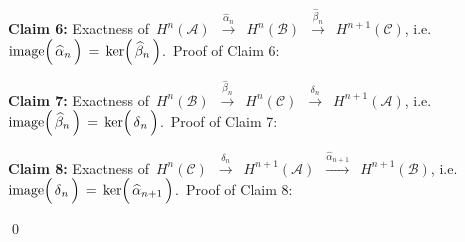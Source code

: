 \vskip 0.5cm
\noindent
\textbf{Claim 6:}\;\;
Exactness of
\,$H^{n}(\mathcal{A})$
\,$\overset{\widehat{\alpha}_{n}}{\longrightarrow}$\,
$H^{n}(\mathcal{B})$
\,$\overset{\widehat{\beta}_{n}}{\longrightarrow}$\,
$H^{n+1}(\mathcal{C})$,\;
i.e.
\,$\image\!\left(\,\overset{{\color{white}.}}{\widehat{\alpha}_{n}}\,\right) \,=\, \ker\!\left(\,\widehat{\beta}_{n}\,\right)$.\,
\vskip 0.2cm
\noindent
Proof of Claim 6:\,


\vskip 0.5cm
\noindent
\textbf{Claim 7:}\;\;
Exactness of
\,$H^{n}(\mathcal{B})$
\,$\overset{\widehat{\beta}_{n}}{\longrightarrow}$\,
$H^{n}(\mathcal{C})$
\,$\overset{\delta_{n}}{\longrightarrow}$\,
$H^{n+1}(\mathcal{A})$,\;
i.e.
\,$\image\!\left(\,\widehat{\beta}_{n}\,\right) \,=\, \ker\!\left(\,\overset{{\color{white}.}}{\delta}_{n}\,\right)$.\,
\vskip 0.2cm
\noindent
Proof of Claim 7:\,


\vskip 0.5cm
\noindent
\textbf{Claim 8:}\;\;
Exactness of
\,$H^{n}(\mathcal{C})$
\,$\overset{\delta_{n}}{\longrightarrow}$\,
$H^{n+1}(\mathcal{A})$
\,$\overset{\widehat{\alpha}_{n+1}}{\longrightarrow}$\,
$H^{n+1}(\mathcal{B})$,\;
i.e.
\,$\image\!\left(\,\overset{{\color{white}.}}{\delta}_{n}\,\right) \,=\, \ker\!\left(\,\overset{{\color{white}.}}{\widehat{\alpha}_{n+1}}\,\right)$.\,
\vskip 0.2cm
\noindent
Proof of Claim 8:\,


\qed

